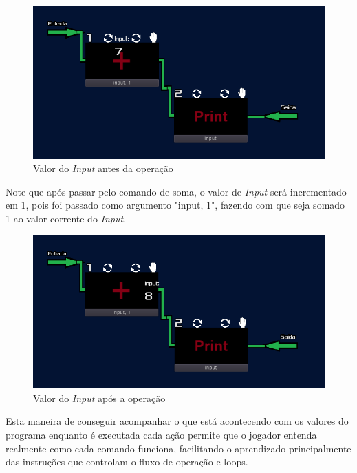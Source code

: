 \begin{figure}[H]
    \includegraphics[width=\textwidth]{../figuras/antes_da_soma.png}
    \caption{Valor do \textit{Input} antes da opera\c{c}\~{a}o}
\end{figure}

Note que após passar pelo comando de soma, o valor de \textit{Input} será 
incrementado em 1, pois foi passado como argumento "input, 1", fazendo com que 
seja somado 1 ao valor corrente do \textit{Input}.

\begin{figure}[H]
    \includegraphics[width=\textwidth]{../figuras/depois_da_soma.png}
    \caption{Valor do \textit{Input} após a opera\c{c}\~{a}o}
\end{figure}

Esta maneira de conseguir acompanhar o que está acontecendo com os valores do 
programa enquanto é executada cada ação permite que o jogador entenda realmente
como cada comando funciona, facilitando o aprendizado principalmente das 
instruções que controlam o fluxo de operação e loops.

